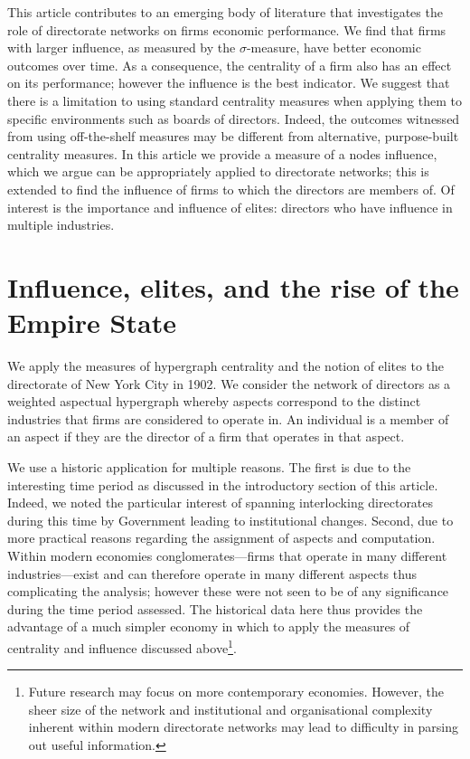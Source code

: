 \documentclass[11pt,fleqn]{article}
\begin{document}
This article contributes to an emerging body of literature that investigates the role of directorate networks on firms economic performance. We find that firms with larger influence, as measured by the $\sigma$-measure, have better economic outcomes over time. As a consequence, the centrality of a firm also has an effect on its performance; however the influence is the best indicator. We suggest that there is a limitation to using standard centrality measures when applying them to specific environments such as boards of directors. Indeed, the outcomes witnessed from using off-the-shelf measures may be different from alternative, purpose-built centrality measures. In this article we provide a measure of a nodes influence, which we argue can be appropriately applied to directorate networks; this is extended to find the influence of firms to which the directors are members of. Of interest is the importance and influence of elites: directors who have influence in multiple industries.

\section{Influence, elites, and the rise of the Empire State} 
\label{Application:Network}

We apply the measures of hypergraph centrality and the notion of elites to the directorate of New York City in 1902. We consider the network of directors as a weighted aspectual hypergraph whereby aspects correspond to the distinct industries that firms are considered to operate in. An individual is a member of an aspect if they are the director of a firm that operates in that aspect.

We use a historic application for multiple reasons. The first is due to the interesting time period as discussed in the introductory section of this article. Indeed, we noted the particular interest of spanning interlocking directorates during this time by Government leading to institutional changes. Second, due to more practical reasons regarding the assignment of aspects and computation. Within modern economies conglomerates---firms that operate in many different industries---exist and can therefore operate in many different aspects thus complicating the analysis; however these were not seen to be of any significance during the time period assessed. The historical data here thus provides the advantage of a much simpler economy in which to apply the measures of centrality and influence discussed above\footnote{Future research may focus on more contemporary economies. However, the sheer size of the network and institutional and organisational complexity inherent within modern directorate networks may lead to difficulty in parsing out useful information.}.
\end{document}
